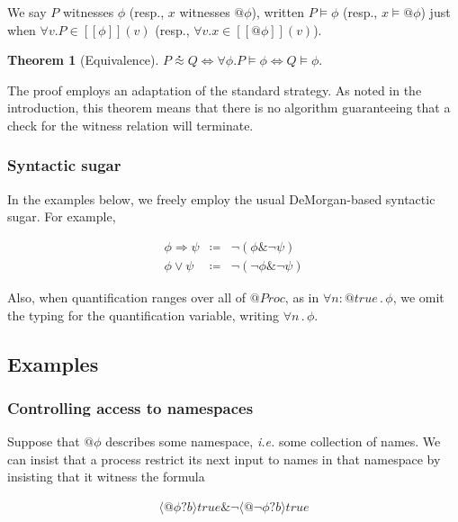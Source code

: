 \documentclass[]{amsart}
\makeatletter
\newcommand{\ldb}{[\![}
\newcommand{\rdb}{]\!]}
\newcommand{\quotep}[1]{@#1}
\newcommand{\meaningof}[1]{\ldb #1 \rdb}
\newcommand{\QProc}{\quotep{\mathbin{Proc}}}
\newcommand{\defneqls}{\coloneqq}
\newcommand{\wbbisim}{\stackrel{\centerdot}{\approx}} %
\newcommand{\ptrue}{\mathbin{true}}
\newcommand{\pprefix}[3]{\langle #1 ? #2 \rangle #3}
\newcommand{\pquant}[3]{\forall #1 \mathbin{:} #2 \mathbin{.} #3}
\newcommand{\pquantuntyped}[2]{\forall #1 \mathbin{.} #2}
\newcommand{\riff}{\Leftrightarrow}
\newtheorem{thm}{Theorem}[subsection]
\theoremstyle{definition}
\theoremstyle{remark}
\numberwithin{equation}{subsection}
\makeatother
\begin{document}
We say $P$ witnesses $\phi$ (resp., $x$ witnesses $\quotep{\phi}$),
written $P \models \phi$ (resp., $x \models \quotep{\phi}$) just when
$\forall v . P \in \meaningof{\phi}(v)$ (resp., $\forall v . x \in \meaningof{\quotep{\phi}}(v)$).

\begin{thm}[Equivalence]
	$P \wbbisim Q \riff \forall \phi . P \models \phi \riff Q \models \phi .$
\end{thm}

The proof employs an adaptation of the standard strategy. As noted in
the introduction, this theorem means that there is no algorithm
guaranteeing that a check for the witness relation will terminate.

\subsubsection{Syntactic sugar }

In the examples below, we freely employ the usual DeMorgan-based
syntactic sugar. For example,

\begin{eqnarray}
	\phi \Rightarrow \psi & \defneqls & \neg ( \phi \& \neg \psi ) \nonumber\\
	\phi \vee \psi & \defneqls & \neg ( \neg \phi \& \neg \psi ) \nonumber
\end{eqnarray}

Also, when quantification ranges over all of $\QProc$, as in
$\pquant{n}{\quotep{\ptrue}}{\phi}$, we omit the typing for the
quantification variable, writing $\pquantuntyped{n}{\phi}$.

\subsection{Examples}

\subsubsection{Controlling access to namespaces}
\label{namespace}
Suppose that $\quotep{\phi}$ describes some namespace, {\em i.e.} some
collection of names. We can insist that a process restrict its next
input to names in that namespace by insisting that it witness the formula

\begin{eqnarray}
  \pprefix{\quotep{\phi}}{b}{\ptrue} \& \neg \pprefix{\quotep{\neg \phi}}{b}{\ptrue} \nonumber
\end{eqnarray}
\end{document}
